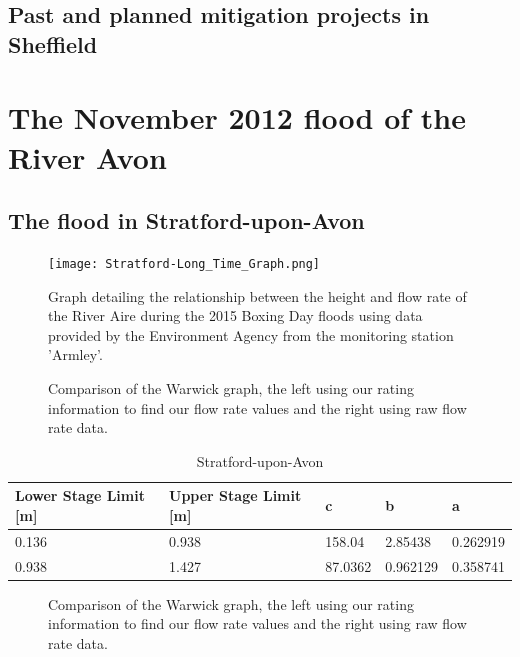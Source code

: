 \documentclass[11pt,a4paper]{article}
\begin{document}
\subsection{Past and planned mitigation projects in Sheffield}

\section{The November 2012 flood of the River Avon}
\subsection{The flood in Stratford-upon-Avon}
\begin{figure}[H]
\begin{center}
\texttt{[image: Stratford-Long\_Time\_Graph.png]}
\caption{Graph detailing the relationship between the height and flow rate of the River Aire during the 2015 Boxing Day floods using data provided by the Environment Agency from the monitoring station 'Armley'.}
\end{center}
\end{figure}

\begin{figure}[H]
\centering
{}
\hfill
{}
\caption{Comparison of the Warwick graph, the left using our rating information to find our flow rate values and the right using raw flow rate data.}
\end{figure}

\begin{table}[H]
\centering
\begin{tabular}{|l|l|l|l|l|}
\hline
Lower Stage Limit {[}m{]} & Upper Stage Limit {[}m{]} & c & b & a \\
\hline
0.136 & 0.938 & 158.04 & 2.85438 & 0.262919 \\
0.938 & 1.427 & 87.0362 & 0.962129 & 0.358741 \\
\hline
\end{tabular}
\caption{Stratford-upon-Avon}
\end{table}
\begin{figure}[H]
\centering
{}
\hfill
{}
\caption{Comparison of the Warwick graph, the left using our rating information to find our flow rate values and the right using raw flow rate data.}
\end{figure}
\end{document}
